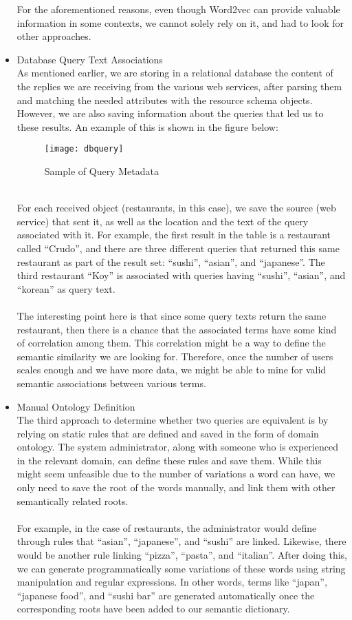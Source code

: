 \begin{itemize}
For the aforementioned reasons, even though Word2vec can provide valuable information in some contexts, we cannot solely rely on it, and had to look for other approaches.
\newpage
\item Database Query Text Associations\\
As mentioned earlier, we are storing in a relational database the content of the replies we are receiving from the various web services, after parsing them and matching the needed attributes with the resource schema objects. However, we are also saving information about the queries that led us to these results. An example of this is shown in the figure below:
\begin{figure}[h]
\centering
\texttt{[image: dbquery]}
\caption{Sample of Query Metadata}
\end{figure}
\\
For each received object (restaurants, in this case), we save the source (web service) that sent it, as well as the location and the text of the query associated with it. For example, the first result in the table is a restaurant called ``Crudo'', and there are three different queries that returned this same restaurant as part of the result set: ``sushi'', ``asian'', and ``japanese''. The third restaurant ``Koy'' is associated with queries having ``sushi'', ``asian'', and ``korean'' as query text.\\\\
The interesting point here is that since some query texts return the same restaurant, then there is a chance that the associated terms have some kind of correlation among them. This correlation might be a way to define the semantic similarity we are looking for. Therefore, once the number of users scales enough and we have more data, we might be able to mine for valid semantic associations between various terms.
\pagebreak
\item Manual Ontology Definition\\
The third approach to determine whether two queries are equivalent is by relying on static rules that are defined and saved in the form of domain ontology. The system administrator, along with someone who is experienced in the relevant domain, can define these rules and save them. While this might seem unfeasible due to the number of variations a word can have, we only need to save the root of the words manually, and link them with other semantically related roots.\\\\
For example, in the case of restaurants, the administrator would define through rules that ``asian'', ``japanese'', and ``sushi'' are linked. Likewise, there would be another rule linking ``pizza'', ``pasta'', and ``italian''. After doing this, we can generate programmatically some variations of these words using string manipulation and regular expressions. In other words, terms like ``japan'', ``japanese food'', and ``sushi bar'' are generated automatically once the corresponding roots have been added to our semantic dictionary.\\\\

\end{itemize}
